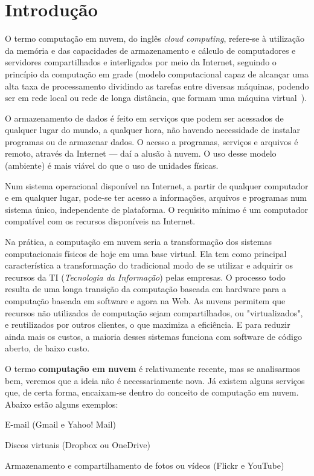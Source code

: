 \section{Introdução}

O termo computação em nuvem, do inglês \emph{cloud computing}, refere-se à
utilização da memória e das capacidades de armazenamento e cálculo de
computadores e servidores compartilhados e interligados por meio da Internet,
seguindo o princípio da computação em grade (modelo computacional capaz de
alcançar uma alta taxa de processamento dividindo as tarefas entre diversas
máquinas, podendo ser em rede local ou rede de longa distância, que formam uma
máquina virtual~\cite{ibm-redbooks-grid-computing}).

O armazenamento de dados é feito em serviços que podem ser acessados de qualquer
lugar do mundo, a qualquer hora, não havendo necessidade de instalar
programas ou de armazenar dados. O acesso a programas, serviços e arquivos é
remoto, através da Internet --- daí a alusão à nuvem. O uso desse modelo (ambiente)
é mais viável do que o uso de unidades físicas.

Num sistema operacional disponível na Internet, a partir de qualquer computador e em
qualquer lugar, pode-se ter acesso a informações, arquivos e programas num sistema
único, independente de plataforma. O requisito mínimo é um computador compatível
com os recursos disponíveis na Internet.

Na prática, a computação em nuvem seria a transformação dos sistemas
computacionais físicos de hoje em uma base virtual. Ela tem como principal
característica a transformação do tradicional modo de se utilizar e adquirir os
recursos da TI (\emph{Tecnologia da Informação}) pelas empresas. O processo todo
resulta de uma longa transição da computação baseada em hardware para a computação
baseada em software e agora na Web. As nuvens permitem que recursos não utilizados
de computação sejam compartilhados, ou "virtualizados", e reutilizados por outros
clientes, o que maximiza a eficiência. E para reduzir ainda mais os custos, a maioria
desses sistemas funciona com software de código aberto, de baixo custo.

O termo \textbf{computação em nuvem} é relativamente recente, mas se analisarmos bem,
veremos que a ideia não é necessariamente nova. Já existem alguns serviços que,
de certa forma, encaixam-se dentro do conceito de computação em nuvem. Abaixo estão
alguns exemplos:

\begin{itemise}
    \item E-mail (Gmail e Yahoo! Mail)

    \item Discos virtuais (Dropbox ou OneDrive)

    \item Armazenamento e compartilhamento de fotos ou vídeos (Flickr e YouTube)
\end{itemise}
